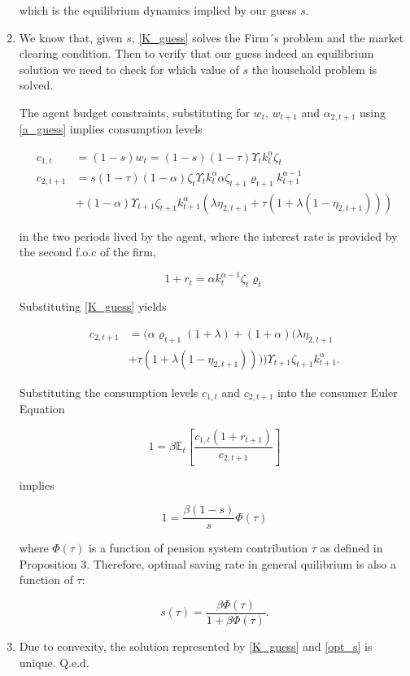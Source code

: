 \documentclass[12pt,a4paper]{article}
\begin{document}
\begin{enumerate}
  which is the equilibrium dynamics implied by our guess $s$.

  \item We know that, given $s$, \ref{K_guess} solves the Firm´s problem and the market clearing condition. Then to verify that our guess indeed an equilibrium solution we need to check for which value of $s$ the household problem is solved.

  The agent budget constraints, substituting for $w_t$, $w_{t + 1}$ and $\alpha_{2, t+1}$ using \ref{a_guess} implies consumption levels

    \begin{align*}
      c_{1,t}& = (1 - s) w_t =(1 - s)(1 - \tau) \Upsilon_t k_t^\alpha \zeta_t  \\
      c_{2,t+1} & = s(1 - \tau) (1 - \alpha)\zeta_{t} \Upsilon_t k_t^\alpha \alpha \zeta_{t+1} \varrho_{t+1} k_{t+1}^{\alpha - 1}   \\
      & + (1 - \alpha) \Upsilon_{t+1}\zeta_{t+1} k_{t+1}^{\alpha} (\lambda \eta_{2, t+1} + \tau (1 + \lambda(1 - \eta_{2, t+1})))
    \end{align*}

  in the two periods lived by the agent, where the interest rate is provided by the second f.o.c of the firm,

  \[
    1 + r_t = \alpha k_t^{\alpha - 1} \zeta_{t} \varrho_{t}
  \]

  Substituting \ref{K_guess} yields

    \begin{align*}
     c_{2,t+1} & = (\alpha \varrho_{t+1} (1 + \lambda) + (1 + \alpha)(\lambda \eta_{2, t+1}  \\
     & + \tau(1 + \lambda(1 - \eta_{2, t+1})))) \Upsilon_{t+1}\zeta_{t+1} k_{t+1}^{\alpha}.
    \end{align*}

  Substituting the consumption levels $c_{1,t}$ and $c_{2,t+1}$ into the consumer Euler Equation

    \[
      1 = \beta \mathbb{E}_t \left[ \frac{c_{1,t} (1+r_{t+1})}{c_{2,t+1}} \right]
    \]

  implies

    \[
    1 =  \frac{\beta(1 - s)}{s}\Phi(\tau)
    \]

  where $\Phi(\tau)$ is a function of pension system contribution $\tau$ as defined in Proposition 3. Therefore, optimal saving rate in general quilibrium is also a function of $\tau$:

    \begin{equation}
      s(\tau) = \frac{\beta \Phi(\tau)}{1 + \beta \Phi(\tau)}.
      \label{opt_s}
    \end{equation}

  \item Due to convexity, the solution represented by \ref{K_guess} and \ref{opt_s} is unique.  Q.e.d.

\end{enumerate}
\end{document}
